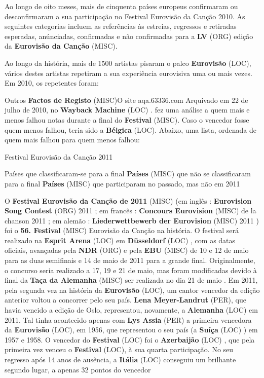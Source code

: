 \documentclass[12pt,a4paper]{article}
\begin{document}
Ao longo de oito meses, mais de cinquenta países europeus confirmaram ou desconfirmaram a sua participação no Festival Eurovisão da Canção 2010. As seguintes categorias incluem as referências às estreias, regressos e retiradas esperadas, anúnciadas, confirmadas e não confirmadas para a \textbf{LV} (ORG) edição da \textbf{Eurovisão da Canção} (MISC).

Ao longo da história, mais de 1500 artistas pisaram o palco \textbf{Eurovisão} (LOC), vários destes artistas repetiram a sua experiência eurovisiva uma ou mais vezes. Em 2010, os repetentes foram:



Outros \textbf{Factos de Registo} (MISC)O site aqa.63336.com Arquivado em 22 de julho de 2010, no \textbf{Wayback Machine} (LOC) . fez uma análise a quem mais e menos falhou notas durante a final do \textbf{Festival} (MISC). Caso o vencedor fosse quem menos falhou, teria sido a \textbf{Bélgica} (LOC). Abaixo, uma lista, ordenada de quem mais falhou para quem menos falhou:



Festival Eurovisão da Canção 2011



Países que classificaram-se para a final \textbf{Países} (MISC) que não se classificaram para a final \textbf{Países} (MISC) que participaram no passado, mas não em 2011

O \textbf{Festival Eurovisão da Canção de 2011} (MISC) (em inglês : \textbf{Eurovision Song Contest} (ORG) 2011 ; em francês : \textbf{Concours Eurovision} (MISC) de la chanson 2011 ; em alemão : \textbf{Liederwettbewerb der Eurovision} (MISC) 2011 ) foi o \textbf{56. Festival} (MISC) Eurovisão da Canção na história. O festival será realizado na \textbf{Esprit Arena} (LOC) em \textbf{Düsseldorf} (LOC) , com as datas oficiais, avançadas pela \textbf{NDR} (ORG) e pela \textbf{EBU} (MISC) de 10 e 12 de maio para as duas semifinais e 14 de maio de 2011 para a grande final. Originalmente, o concurso seria realizado a 17, 19 e 21 de maio, mas foram modificadas devido à final da \textbf{Taça da Alemanha} (MISC) ser realizada no dia 21 de maio . Em 2011, pela segunda vez na história da \textbf{Eurovisão} (LOC), um cantor vencedor da edição anterior voltou a concorrer pelo seu país. \textbf{Lena Meyer-Landrut} (PER), que havia vencido a edição de Oslo, representou, novamente, a \textbf{Alemanha} (LOC) em 2011. Tal tinha acontecido apenas com \textbf{Lys Assia} (PER) a primeira vencedora da \textbf{Eurovisão} (LOC), em 1956, que representou o seu país (a \textbf{Suíça} (LOC) ) em 1957 e 1958. O vencedor do \textbf{Festival} (LOC) foi o \textbf{Azerbaijão} (LOC) , que pela primeira vez venceu o \textbf{Festival} (LOC), à sua quarta participação. No seu regresso após 14 anos de ausência, a \textbf{Itália} (LOC) conseguiu um brilhante segundo lugar, a apenas 32 pontos do vencedor
\end{document}
